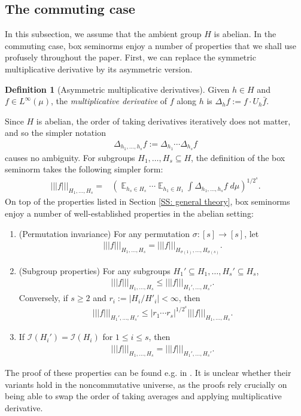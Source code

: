 \documentclass[11pt]{amsart}
\theoremstyle{definition}
\newtheorem{definition}[lemma]{Definition}
\DeclareMathOperator*{\E}{\mathbb{E}}
\newcommand{\CI}{{\mathcal I}}
\newcommand{\nnorm}[1]{\lvert\!|\!| #1|\!|\!\rvert}
\newcommand{\1}{{\mathbf{1}}}
\newcommand{\brac}[1]{\mathopen{}\left( #1 \mathclose{}\right)}
\begin{document}
\subsection{The commuting case}\label{SS: commuting}

In this subsection, we assume that the ambient group $H$ is abelian. In the commuting case, box seminorms enjoy a number of properties that we shall use profusely throughout the paper. First, we can replace the symmetric multiplicative derivative by its asymmetric version.
\begin{definition}[Asymmetric multiplicative derivatives]
    Given $h\in H$ and $f\in L^\infty(\mu)$, the \textit{multiplicative derivative} of $f$ along $h$ is $\Delta_h f:=f\cdot U_{h}\bar f$.
\end{definition}
Since $H$ is abelian, the order of taking derivatives iteratively does not matter, and so the simpler notation
\begin{align*}
    \Delta_{h_1, \ldots, h_s}f := \Delta_{h_1}\cdots \Delta_{h_s}f
\end{align*}
causes no ambiguity. For subgroups $H_1, \ldots, H_s\subseteq H$, the definition of the box seminorm takes the following simpler form:
    \begin{align*}
        \nnorm{f}_{H_1, \ldots, H_s} =&\brac{\E_{h_s\in H_s}\cdots \E_{h_1\in H_1}\int \Delta_{h_1, \ldots, h_s}f\; d\mu}^{1/2^s}.
    \end{align*}
On top of the properties listed in Section \ref{SS: general theory}, box seminorms enjoy a number of well-established properties in the abelian setting:
\begin{enumerate}
    \item (Permutation invariance) For
    any permutation $\sigma:[s]\to[s]$,  let
    \begin{align*}
        \nnorm{f}_{H_1, \ldots, H_s} = \nnorm{f}_{H_{\sigma(1)},\ldots, H_{\sigma(s)}}.
    \end{align*}
    \item \label{I:scaling} (Subgroup properties) For any subgroups $H_1'\subseteq H_1, \ldots, H_s'\subseteq H_s$,  
    \begin{align*}
        \nnorm{f}_{H_1, \ldots, H_s}\leq \nnorm{f}_{H_1', \ldots, H_s'}.
    \end{align*}
    Conversely, if $s\geq 2$ and $r_i:=|H_i/H'_i|<\infty$, then
    \begin{align*}
        \nnorm{f}_{H_1', \ldots, H_s'}\leq |r_1\cdots r_s|^{1/2^s}\nnorm{f}_{H_1, \ldots, H_s}.
    \end{align*}
    \item If $\CI(H_i') = \CI(H_i)$ for $1\leq i\leq s$, then
    \begin{align}\label{E: same invariant factors}
        \nnorm{f}_{H_1, \ldots, H_s} = \nnorm{f}_{H_1',\ldots, H_s'}.
    \end{align}
\end{enumerate}
 The proof of these properties can be found e.g. in \cite{DKKST24, FrKu22b, H09}. It is unclear whether their variants hold in the noncommutative universe, as the proofs rely crucially on being able to swap the order of taking averages and applying multiplicative derivative. 
\end{document}
